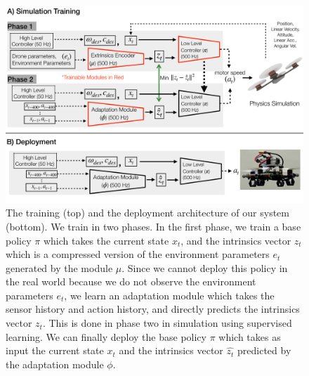 \begin{figure}
\centering
\includegraphics[width=\linewidth]{img/method-figures-no-last-act.pdf}
\caption{\small The training (top) and the deployment architecture of our system (bottom). We train in two phases. In the first phase, we train a base policy $\pi$ which takes the current state $x_t$, and the intrinsics vector $z_t$ which is a compressed version of the environment parameters $e_t$ generated by the module $\mu$. Since we cannot deploy this policy in the real world because we do not observe the environment parameters $e_t$, we learn an adaptation module which takes the sensor history and action history, and directly predicts the intrinsics vector $z_t$. This is done in phase two in simulation using supervised learning. We can finally deploy the base policy $\pi$ which takes as input the current state $x_t$ and the intrinsics vector $\hat{z_t}$ predicted by the adaptation module $\phi$.}
\vspace{-2ex}
\label{fig:method}
\end{figure}

